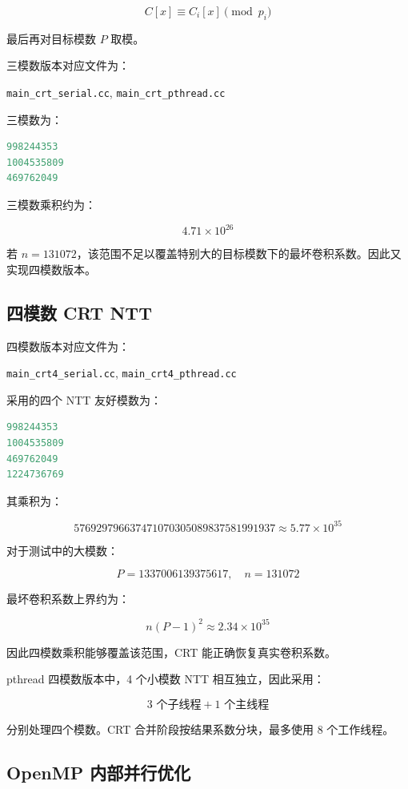 \documentclass[UTF8,a4paper,12pt]{ctexart}
\begin{document}
\[
C[x] \equiv C_i[x] \pmod {p_i}
\]

最后再对目标模数 \(P\) 取模。

三模数版本对应文件为：

\begin{center}
\texttt{main\_crt\_serial.cc}, \quad \texttt{main\_crt\_pthread.cc}
\end{center}

三模数为：

\begin{lstlisting}[language=C++]
998244353
1004535809
469762049
\end{lstlisting}

三模数乘积约为：

\[
4.71 \times 10^{26}
\]

若 \(n=131072\)，该范围不足以覆盖特别大的目标模数下的最坏卷积系数。因此又实现四模数版本。

\subsection{四模数 CRT NTT}

四模数版本对应文件为：

\begin{center}
\texttt{main\_crt4\_serial.cc}, \quad \texttt{main\_crt4\_pthread.cc}
\end{center}

采用的四个 NTT 友好模数为：

\begin{lstlisting}[language=C++]
998244353
1004535809
469762049
1224736769
\end{lstlisting}

其乘积为：

\[
576929796637471070305089837581991937 \approx 5.77 \times 10^{35}
\]

对于测试中的大模数：

\[
P=1337006139375617,\quad n=131072
\]

最坏卷积系数上界约为：

\[
n(P-1)^2 \approx 2.34 \times 10^{35}
\]

因此四模数乘积能够覆盖该范围，CRT 能正确恢复真实卷积系数。

pthread 四模数版本中，4 个小模数 NTT 相互独立，因此采用：

\[
3 \text{ 个子线程} + 1 \text{ 个主线程}
\]

分别处理四个模数。CRT 合并阶段按结果系数分块，最多使用 8 个工作线程。

\subsection{OpenMP 内部并行优化}
\end{document}
